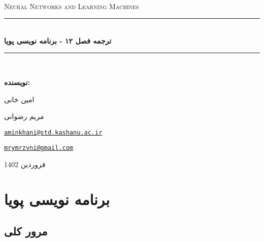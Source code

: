 \documentclass[oneside, 11pt, a4paper]{book}
\newcommand{\HRule}{\rule{\linewidth}{0.5mm}}
\newlength{\saveparindent}
\newcommand{\indentpar}{\par\hspace*{\saveparindent}\ignorespaces}
\begin{document}
\begin{center}
    \mbox{}\\[2.0cm]
    \textsc{\Huge Neural Networks and Learning Machines}\\[2.5cm]
    \HRule\\[0.4cm]
    {\large \bf {\selectfont ترجمه فصل ۱۲ - برنامه نویسی پویا}}\\[0.2cm]
    \HRule\\[1.5cm]
\end{center}

\begin{flushright}
    \textbf{\selectfont نویسنده:}
\end{flushright}

\begin{center}
    \begin{minipage}{0.5\textwidth}
        \begin{flushright}
            \indentpar امین خانی \\
            \indentpar مریم رضوانی
        \end{flushright}
    \end{minipage}%
    \begin{minipage}{0.5\textwidth}
        \begin{flushleft}
            \indentpar \href{mailto:aminkhani@std.kashanu.ac.ir}{\texttt{aminkhani@std.kashanu.ac.ir}} \\
            \indentpar \href{mailto:mrymrzvni@gmail.com}{\texttt{mrymrzvni@gmail.com}}
        \end{flushleft}
    \end{minipage}
\end{center}


\vspace{\fill}
\begin{minipage}[b]{\textwidth}
    \centering
    \large
    فروردین 1402
    \vspace{30mm}
\end{minipage}%

\thispagestyle{empty}

\setcounter{page}{0}

\newpage
\tableofcontents
\newpage

\chapter{
    \LARGE{
    برنامه نویسی پویا
    }
}

\section*{مرور کلی}
\end{document}

